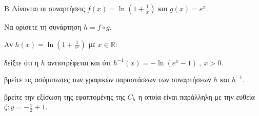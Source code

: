 \begin{thema}{Β}
Δίνονται οι συναρτήσεις $f(x)=\ln{\left(1+\frac{1}{x}\right)}$ και $g(x)=e^x$.
\begin{erwthma}
\item Να ορίσετε τη συνάρτηση $h=f\circ g$.
\end{erwthma}
Αν $h(x)=\ln\left(1+\frac{1}{e^x}\right)$ με $x\in\mathbb{R}$:
\begin{erwthma}[resume]
\item δείξτε ότι η $h$ αντιστρέφεται και ότι $h^{-1}(x)=-\ln{\left(e^x-1\right)}\ ,\ x>0$.
\item βρείτε τις ασύμπτωτες των γραφικών παραστάσεων των συναρτήσεων $h$ και $h^{-1}$.
\item βρείτε την εξίσωση της εφαπτομένης της $C_h$ η οποία είναι παράλληλη με την ευθεία $\zeta: y=-\frac{x}{2}+1$.
\end{erwthma}
\end{thema}
